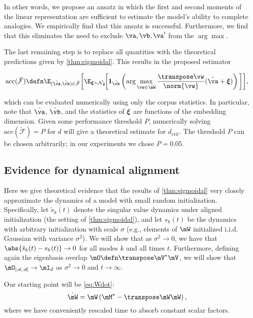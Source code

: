 In other words, we propose an ansatz in which the first and second moments of the linear representation are sufficient to estimate the model's ability to complete analogies. We empirically find that this ansatz is successful. Furthermore, we find that this eliminates the need to exclude $\va,\vb,\va'$ from the $\arg\max$.

The last remaining step is to replace all quantities with the theoretical predictions given by \cref{thm:sigmoidal}. This results in the proposed estimator

\begin{equation}
    \mathrm{acc}(\mathcal{\tilde F}) \defn \E_{(\tilde\va,\tilde\vb)\in\mathcal{\tilde F}}\bigg[\E_{\vxi\sim\mathcal{N}_{\tilde\vdelta}} \! \bigg[ \mathbf{1}_{\tilde\vb}\left(\arg\max_{\vw\in\tilde\mW} \frac{\T\vw}{\norm{\vw}}(\tilde\va+\vxi) \right) \bigg]\bigg],
\end{equation}

which can be evaluated numerically using only the corpus statistics. In particular, note that $\tilde\va$, $\tilde\vb$, and the statistics of $\boldsymbol{\xi}$ are functions of the embedding dimension. Given some performance threshold $P$, numerically solving $\mathrm{acc}(\mathcal{\tilde F})=P$ for $d$ will give a theoretical estimate for $d_\mathrm{crit}$. The threshold $P$ can be chosen arbitrarily; in our experiments we chose $P=0.05$.



\subsection{Evidence for dynamical alignment}
\label{appdx:derivations-QR}

Here we give theoretical evidence that the results of \cref{thm:sigmoidal} very closely approximate the dynamics of a model with small random initialization. Specifically, let $\tilde s_k(t)$ denote the singular value dynamics under aligned initialization (the setting of \cref{thm:sigmoidal}), and let $s_k(t)$ be the dynamics with arbitrary initialization with scale $\sigma$ (e.g., elements of $\mW$ initialized i.i.d. Gaussian with variance $\sigma^2$). We will show that as $\sigma^2\to 0$, we have that $\abs{\tilde s_k(t)-s_k(t)}\to0$ for all modes $k$ and all times $t$. Furthermore, defining again the eigenbasis overlap $\O\defn \T{\mV^\star}\mV$, we will show that $\O_{[:d,:d]}\to\mI_d$ as $\sigma^2\to 0$ and $t\to\infty$.

Our starting point will be \cref{eq:Wdot}:
\begin{equation}
    \dot \mW = \mW \left(\Mstar - \T\mW\mW\right),
    \label{eq:Wdot2}
\end{equation}
where we have conveniently rescaled time to absorb constant scalar factors.

